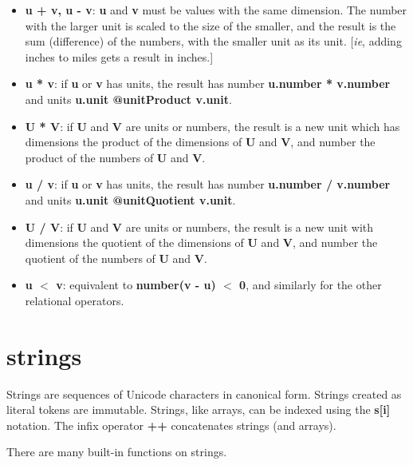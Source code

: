 \documentclass{report}
\begin{document}
\begin{itemize}\item {\bf u + v, u - v}: {\bf u} and {\bf v} must be values with the same dimension. The number
with the larger unit is scaled to the size of the smaller, and the result is
the sum (difference) of the numbers, with the smaller unit as its unit. {[}{\em ie},
adding inches to miles gets a result in inches.{]}

\item {\bf u * v}: if {\bf u} or {\bf v} has units, the result has number {\bf u.number *
v.number} and units {\bf u.unit @unitProduct v.unit}.

\item {\bf U * V}: if {\bf U} and {\bf V} are units or numbers, the result is a new unit which
has dimensions the product of the dimensions of {\bf U} and {\bf V}, and number the
product of the numbers of {\bf U} and {\bf V}.

\item {\bf u / v}: if {\bf u} or {\bf v} has units, the result has number {\bf u.number / v.number}
and units {\bf u.unit @unitQuotient v.unit}.

\item {\bf U / V}: if {\bf U} and {\bf V} are units or numbers, the result is a new unit with
dimensions the quotient of the dimensions of {\bf U} and {\bf V}, and number the
quotient of the numbers of {\bf U} and {\bf V}.

\item {\bf u $<$ v}: equivalent to {\bf number(v - u) $<$ 0}, and similarly for the other
relational operators.

\end{itemize}\section{strings}


Strings are sequences of Unicode characters in canonical form. Strings created
as literal tokens are immutable. Strings, like arrays, can be indexed using
the {\bf s{[}i{]}} notation. The infix operator {\bf ++} concatenates strings (and
arrays).

There are many built-in functions on strings.
\end{document}
